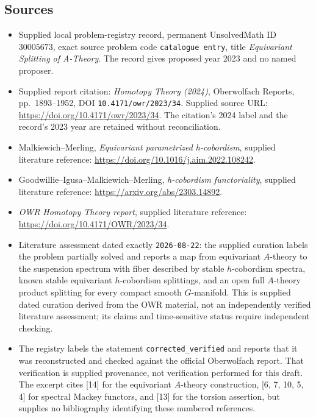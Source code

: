 \documentclass[11pt]{article}
\begin{document}
\subsection{Sources}
\begin{itemize}
\item Supplied local problem-registry record, permanent UnsolvedMath ID \(30005673\), exact source problem code \texttt{catalogue entry}, title \emph{Equivariant Splitting of A-Theory}. The record gives proposed year 2023 and no named proposer.
\item Supplied report citation: \emph{Homotopy Theory (2024)}, Oberwolfach Reports, pp.\ 1893--1952, DOI \texttt{10.4171/owr/2023/34}. Supplied source URL: \url{https://doi.org/10.4171/owr/2023/34}. The citation's 2024 label and the record's 2023 year are retained without reconciliation.
\item Malkiewich--Merling, \emph{Equivariant parametrized h-cobordism}, supplied literature reference: \url{https://doi.org/10.1016/j.aim.2022.108242}.
\item Goodwillie--Igusa--Malkiewich--Merling, \emph{h-cobordism functoriality}, supplied literature reference: \url{https://arxiv.org/abs/2303.14892}.
\item \emph{OWR Homotopy Theory report}, supplied literature reference: \url{https://doi.org/10.4171/OWR/2023/34}.
\item Literature assessment dated exactly \texttt{2026-08-22}: the supplied curation labels the problem partially solved and reports a map from equivariant \(A\)-theory to the suspension spectrum with fiber described by stable \(h\)-cobordism spectra, known stable equivariant \(h\)-cobordism splittings, and an open full \(A\)-theory product splitting for every compact smooth \(G\)-manifold. This is supplied dated curation derived from the OWR material, not an independently verified literature assessment; its claims and time-sensitive status require independent checking.
\item The registry labels the statement \texttt{corrected\_verified} and reports that it was reconstructed and checked against the official Oberwolfach report. That verification is supplied provenance, not verification performed for this draft. The excerpt cites [14] for the equivariant \(A\)-theory construction, [6, 7, 10, 5, 4] for spectral Mackey functors, and [13] for the torsion assertion, but supplies no bibliography identifying these numbered references.
\end{itemize}
\end{document}
